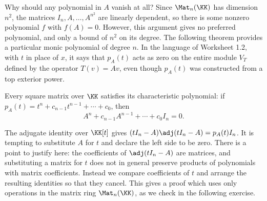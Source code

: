 \documentclass[12pt,reqno]{amsart}
\begin{document}
Why should any polynomial in $A$ vanish at all? Since $\Mat_n(\KK)$ has dimension $n^2$, the matrices $I_n,A,\ldots,A^{n^2}$ are linearly dependent, so there is some nonzero polynomial $f$ with $f(A)=0$. However, this argument gives no preferred polynomial, and only a bound of $n^2$ on its degree. The following theorem provides a particular monic polynomial of degree $n$. In the language of Worksheet 1.2, with $t$ in place of $x$, it says that $p_A(t)$ acts as zero on the entire module $V_T$ defined by the operator $T(v)=Av$, even though $p_A(t)$ was constructed from a top exterior power.

\begin{theorem}
Every square matrix over $\KK$ satisfies its characteristic polynomial: if $p_A(t)=t^n+c_{n-1}t^{n-1}+\cdots+c_0$, then
\[
A^n+c_{n-1}A^{n-1}+\cdots+c_0I_n=0.
\]
\end{theorem}

The adjugate identity over $\KK[t]$ gives $(tI_n-A)\adj(tI_n-A)=p_A(t)I_n$. It is tempting to substitute $A$ for $t$ and declare the left side to be zero. There is a point to justify here: the coefficients of $\adj(tI_n-A)$ are matrices, and substituting a matrix for $t$ does not in general preserve products of polynomials with matrix coefficients. Instead we compare coefficients of $t$ and arrange the resulting identities so that they cancel. This gives a proof which uses only operations in the matrix ring $\Mat_n(\KK)$, as we check in the following exercise.

\hrulefill
\end{document}
